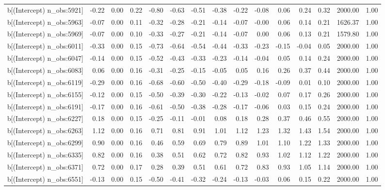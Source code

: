 \begin{table}[ht]
\begin{tabular}{rrrrrrrrrrrrrrr}
  b[(Intercept) n\_obs:5921] & -0.22 & 0.00 & 0.22 & -0.80 & -0.63 & -0.51 & -0.38 & -0.22 & -0.08 & 0.06 & 0.24 & 0.32 & 2000.00 & 1.00 \\ 
  b[(Intercept) n\_obs:5963] & -0.07 & 0.00 & 0.11 & -0.32 & -0.28 & -0.21 & -0.14 & -0.07 & -0.00 & 0.06 & 0.14 & 0.21 & 1626.37 & 1.00 \\ 
  b[(Intercept) n\_obs:5969] & -0.07 & 0.00 & 0.10 & -0.33 & -0.27 & -0.21 & -0.14 & -0.07 & 0.00 & 0.06 & 0.13 & 0.21 & 1579.80 & 1.00 \\ 
  b[(Intercept) n\_obs:6011] & -0.33 & 0.00 & 0.15 & -0.73 & -0.64 & -0.54 & -0.44 & -0.33 & -0.23 & -0.15 & -0.04 & 0.05 & 2000.00 & 1.00 \\ 
  b[(Intercept) n\_obs:6047] & -0.14 & 0.00 & 0.15 & -0.52 & -0.43 & -0.33 & -0.23 & -0.14 & -0.04 & 0.05 & 0.14 & 0.24 & 2000.00 & 1.00 \\ 
  b[(Intercept) n\_obs:6083] & 0.06 & 0.00 & 0.16 & -0.31 & -0.25 & -0.15 & -0.05 & 0.05 & 0.16 & 0.26 & 0.37 & 0.44 & 2000.00 & 1.00 \\ 
  b[(Intercept) n\_obs:6119] & -0.29 & 0.00 & 0.16 & -0.68 & -0.60 & -0.50 & -0.40 & -0.29 & -0.18 & -0.09 & 0.01 & 0.10 & 2000.00 & 1.00 \\ 
  b[(Intercept) n\_obs:6155] & -0.12 & 0.00 & 0.15 & -0.50 & -0.39 & -0.30 & -0.22 & -0.13 & -0.02 & 0.07 & 0.17 & 0.26 & 2000.00 & 1.00 \\ 
  b[(Intercept) n\_obs:6191] & -0.17 & 0.00 & 0.16 & -0.61 & -0.50 & -0.38 & -0.28 & -0.17 & -0.06 & 0.03 & 0.15 & 0.24 & 2000.00 & 1.00 \\ 
  b[(Intercept) n\_obs:6227] & 0.18 & 0.00 & 0.15 & -0.25 & -0.11 & -0.01 & 0.08 & 0.18 & 0.28 & 0.37 & 0.46 & 0.55 & 2000.00 & 1.00 \\ 
  b[(Intercept) n\_obs:6263] & 1.12 & 0.00 & 0.16 & 0.71 & 0.81 & 0.91 & 1.01 & 1.12 & 1.23 & 1.32 & 1.43 & 1.54 & 2000.00 & 1.00 \\ 
  b[(Intercept) n\_obs:6299] & 0.90 & 0.00 & 0.16 & 0.46 & 0.59 & 0.69 & 0.79 & 0.89 & 1.01 & 1.10 & 1.22 & 1.33 & 2000.00 & 1.00 \\ 
  b[(Intercept) n\_obs:6335] & 0.82 & 0.00 & 0.16 & 0.38 & 0.51 & 0.62 & 0.72 & 0.82 & 0.93 & 1.02 & 1.12 & 1.22 & 2000.00 & 1.00 \\ 
  b[(Intercept) n\_obs:6371] & 0.72 & 0.00 & 0.17 & 0.28 & 0.39 & 0.51 & 0.61 & 0.72 & 0.83 & 0.93 & 1.05 & 1.14 & 2000.00 & 1.00 \\ 
  b[(Intercept) n\_obs:6551] & -0.13 & 0.00 & 0.15 & -0.50 & -0.41 & -0.32 & -0.24 & -0.13 & -0.03 & 0.06 & 0.15 & 0.22 & 2000.00 & 1.00 \\ 

\end{tabular}
\end{table}
